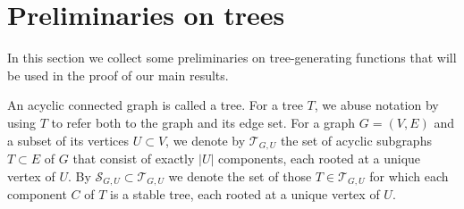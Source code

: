 \documentclass[a4paper,11pt,reqno]{amsart}
\numberwithin{equation}{section}
\begin{document}



\section{Preliminaries on trees}\label{sec:trees}
In this section we collect some preliminaries on tree-generating functions that will be used in the proof of our main results.%

An acyclic connected graph is called a tree. For a tree $T$, we abuse notation by using $T$ to refer both to the graph and its edge set. 
For a graph $G=(V,E)$ and a subset of its vertices $U\subset V$, we denote by $\mathcal{T}_{G,U}$ the set of acyclic subgraphs $T\subset E$ of $G$ that consist of exactly $|U|$ components, each rooted at a unique vertex of $U$.
By $\mathcal{S}_{G,U}\subset \mathcal{T}_{G,U}$ we denote the set of those $T\in \mathcal{T}_{G,U}$ for which each component $C$ of $T$ is a stable tree, each rooted at a unique vertex of $U$.
\end{document}
